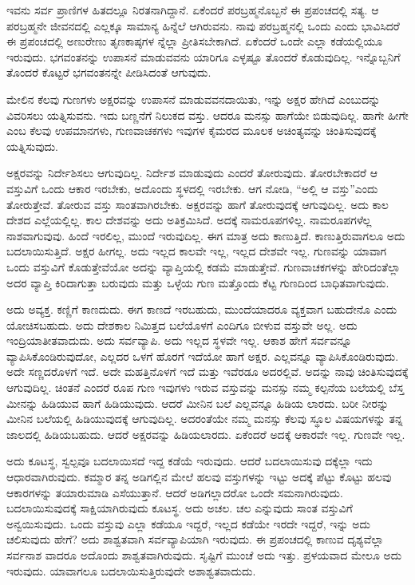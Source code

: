 ಇವನು ಸರ್ವ ಪ್ರಾಣಿಗಳ ಹಿತದಲ್ಲೂ ನಿರತನಾಗಿದ್ದಾನೆ. ಏಕೆಂದರೆ ಪರಬ್ರಹ್ಮನೊಬ್ಬನೆ ಈ ಪ್ರಪಂಚದಲ್ಲಿ ಸತ್ಯ. ಆ ಪರಬ್ರಹ್ಮನೇ ಜೀವನದಲ್ಲಿ ಎಲ್ಲಕ್ಕೂ ಸಾಮಾನ್ಯ ಹಿನ್ನೆಲೆ ಆಗಿರುವನು. ನಾವು ಪರಬ್ರಹ್ಮನಲ್ಲಿ ಒಂದು ಎಂದು ಭಾವಿಸಿದರೆ ಈ ಪ್ರಪಂಚದಲ್ಲಿ ಅಣುರೇಣು ತೃಣಕಾಷ್ಠಗಳ ನ್ನೆಲ್ಲಾ ಪ್ರೀತಿಸಬೇಕಾಗಿದೆ. ಏಕೆಂದರೆ ಒಂದೇ ಎಲ್ಲಾ ಕಡೆಯಲ್ಲಿಯೂ ಇರುವುದು. ಭಗವಂತನನ್ನು ಉಪಾಸನೆ ಮಾಡುವವನು ಯಾರಿಗೂ ಎಳ್ಳಷ್ಟೂ ತೊಂದರೆ ಕೊಡುವುದಿಲ್ಲ. ಇನ್ನೊಬ್ಬನಿಗೆ ತೊಂದರೆ ಕೊಟ್ಟರೆ ಭಗವಂತನನ್ನೇ ಪೀಡಿಸಿದಂತೆ ಆಗುವುದು.

ಮೇಲಿನ ಕೆಲವು ಗುಣಗಳು ಅಕ್ಷರವನ್ನು ಉಪಾಸನೆ ಮಾಡುವವನದಾಯಿತು, ಇನ್ನು ಅಕ್ಷರ ಹೇಗಿದೆ ಎಂಬುದನ್ನು ವಿವರಿಸಲು ಯತ್ನಿಸುವನು. ಇದು ಬಣ್ಣನೆಗೆ ನಿಲುಕದ ವಸ್ತು. ಆದರೂ ಮನಸ್ಸು ಹಾಗೆಯೇ ಬಿಡುವುದಿಲ್ಲ. ಹಾಗೇ ಹೀಗೇ ಎಂಬ ಕೆಲವು ಉಪಮಾನಗಳು, ಗುಣವಾಚಕಗಳು ಇವುಗಳ ಕೈಮರದ ಮೂಲಕ ಅಚಿಂತ್ಯವನ್ನು ಚಿಂತಿಸುವುದಕ್ಕೆ ಯತ್ನಿಸುವುದು.

ಅಕ್ಷರವನ್ನು ನಿರ್ದೇಶಿಸಲು ಆಗುವುದಿಲ್ಲ. ನಿರ್ದೇಶ ಮಾಡುವುದು ಎಂದರೆ ತೋರುವುದು. ತೋರಬೇಕಾದರೆ ಆ ವಸ್ತುವಿಗೆ ಒಂದು ಆಕಾರ ಇರಬೇಕು, ಅದೊಂದು ಸ್ಥಳದಲ್ಲಿ ಇರಬೇಕು. ಆಗ ನೋಡಿ, “ಅಲ್ಲಿ ಆ ವಸ್ತು”ಎಂದು ತೋರುತ್ತೇವೆ. ತೋರುವ ವಸ್ತು ಸಾಂತವಾಗಿರಬೇಕು. ಅಕ್ಷರವನ್ನು ಹಾಗೆ ತೋರುವುದಕ್ಕೆ ಆಗುವುದಿಲ್ಲ. ಅದು ಕಾಲ ದೇಶದ ಎಲ್ಲೆಯಲ್ಲಿಲ್ಲ. ಕಾಲ ದೇಶವನ್ನು ಅದು ಅತಿಕ್ರಮಿಸಿದೆ. ಅದಕ್ಕೆ ನಾಮರೂಪಗಳಿಲ್ಲ. ನಾಮರೂಪಗಳೆಲ್ಲ ನಾಶವಾಗುವುವು. ಹಿಂದೆ ಇರಲಿಲ್ಲ, ಮುಂದೆ ಇರುವುದಿಲ್ಲ. ಈಗ ಮಾತ್ರ ಅದು ಕಾಣುತ್ತಿದೆ. ಕಾಣುತ್ತಿರುವಾಗಲೂ ಅದು ಬದಲಾಯಿಸುತ್ತಿದೆ. ಅಕ್ಷರ ಹೀಗಲ್ಲ. ಅದು ಇಲ್ಲದ ಕಾಲವೇ ಇಲ್ಲ, ಇಲ್ಲದ ದೇಶವೇ ಇಲ್ಲ. ಗುಣವನ್ನು ಯಾವಾಗ ಒಂದು ವಸ್ತುವಿಗೆ ಕೊಡುತ್ತೇವೆಯೋ ಅದನ್ನು ವ್ಯಾಪ್ತಿಯಲ್ಲಿ ಕಡಮೆ ಮಾಡುತ್ತೇವೆ. ಗುಣವಾಚಕಗಳನ್ನು ಹೇರಿದಂತೆಲ್ಲಾ ಅದರ ವ್ಯಾಪ್ತಿ ಕಿರಿದಾಗುತ್ತಾ ಬರುವುದು ಮತ್ತು ಒಳ್ಳೆಯ ಗುಣ ಮತ್ತೊಂದು ಕೆಟ್ಟ ಗುಣದಿಂದ ಬಾಧಿತವಾಗುವುದು.

ಅದು ಅವ್ಯಕ್ತ. ಕಣ್ಣಿಗೆ ಕಾಣದುದು. ಈಗ ಕಾಣದೆ ಇರಬಹುದು, ಮುಂದೆಯಾದರೂ ವ್ಯಕ್ತವಾಗ ಬಹುದೇನೊ ಎಂದು ಯೋಚಿಸಬಹುದು. ಅದು ದೇಶಕಾಲ ನಿಮಿತ್ತದ ಬಲೆಯೊಳಗೆ ಎಂದಿಗೂ ಬೀಳುವ ವಸ್ತುವೇ ಅಲ್ಲ. ಅದು ಇಂದ್ರಿಯಾತೀತವಾದುದು. ಅದು ಸರ್ವವ್ಯಾಪಿ. ಅದು ಇಲ್ಲದ ಸ್ಥಳವೇ ಇಲ್ಲ. ಆಕಾಶ ಹೇಗೆ ಸರ್ವವನ್ನೂ ವ್ಯಾಪಿಸಿಕೊಂಡಿರುವುದೋ, ಎಲ್ಲದರ ಒಳಗೆ ಹೊರಗೆ ಇದೆಯೋ ಹಾಗೆ ಅಕ್ಷರ. ಎಲ್ಲವನ್ನೂ ವ್ಯಾಪಿಸಿಕೊಂಡಿರುವುದು. ಅದೇ ಸಣ್ಣದರೊಳಗೆ ಇದೆ. ಅದೇ ಮಹತ್ತಿನೊಳಗೆ ಇದೆ ಮತ್ತು ಇವೆರಡೂ ಅದರಲ್ಲಿವೆ. ಅದನ್ನು ನಾವು ಚಿಂತಿಸುವುದಕ್ಕೆ ಆಗುವುದಿಲ್ಲ. ಚಿಂತನೆ ಎಂದರೆ ರೂಪ ಗುಣ ಇವುಗಳು ಇರುವ ವಸ್ತುವನ್ನು ಮನಸ್ಸು ನಮ್ಮ ಕಲ್ಪನೆಯ ಬಲೆಯಲ್ಲಿ ಬೆಸ್ತ ಮೀನನ್ನು ಹಿಡಿಯುವ ಹಾಗೆ ಹಿಡಿಯುವುದು. ಆದರೆ ಮೀನಿನ ಬಲೆ ಎಲ್ಲವನ್ನೂ ಹಿಡಿಯ ಲಾರದು. ಬರೀ ನೀರನ್ನು ಮೀನಿನ ಬಲೆಯಲ್ಲಿ ಹಿಡಿಯುವುದಕ್ಕೆ ಆಗುವುದಿಲ್ಲ. ಅದರಂತೆಯೇ ನಮ್ಮ ಮನಸ್ಸು ಕೆಲವು ಸ್ಥೂಲ ವಿಷಯಗಳನ್ನು ತನ್ನ ಜಾಲದಲ್ಲಿ ಹಿಡಿಯಬಹುದು. ಆದರೆ ಅಕ್ಷರವನ್ನು ಹಿಡಿಯಲಾರದು. ಏಕೆಂದರೆ ಅದಕ್ಕೆ ಆಕಾರವೇ ಇಲ್ಲ. ಗುಣವೇ ಇಲ್ಲ.

ಅದು ಕೂಟಸ್ಥ, ಸ್ವಲ್ಪವೂ ಬದಲಾಯಿಸದೆ ಇದ್ದ ಕಡೆಯೆ ಇರುವುದು. ಆದರೆ ಬದಲಾಯಿಸುವು ದಕ್ಕೆಲ್ಲಾ ಇದು ಆಧಾರವಾಗಿರುವುದು. ಕಮ್ಮಾರ ತನ್ನ ಅಡಿಗಲ್ಲಿನ ಮೇಲೆ ಹಲವು ವಸ್ತುಗಳನ್ನು ಇಟ್ಟು ಅದಕ್ಕೆ ಪೆಟ್ಟು ಕೊಟ್ಟು ಹಲವು ಆಕಾರಗಳನ್ನು ತಯಾರುಮಾಡಿ ಎಸೆಯುತ್ತಾನೆ. ಆದರೆ ಅಡಿಗಲ್ಲಾದರೋ ಒಂದೇ ಸಮನಾಗಿರುವುದು. ಬದಲಾಯಿಸುವುದಕ್ಕೆ ಸಾಕ್ಷಿಯಾಗಿರುವುದು ಕೂಟಸ್ಥ. ಅದು ಅಚಲ. ಚಲ ಎನ್ನುವುದು ಸಾಂತ ವಸ್ತುವಿಗೆ ಅನ್ವಯಿಸುವುದು. ಒಂದು ವಸ್ತುವು ಎಲ್ಲಾ ಕಡೆಯೂ ಇದ್ದರೆ, ಇಲ್ಲದ ಕಡೆಯೇ ಇರದೇ ಇದ್ದರೆ, ಇನ್ನು ಅದು ಚಲಿಸುವುದು ಹೇಗೆ? ಅದು ಶಾಶ್ವತವಾಗಿ ಸರ್ವವ್ಯಾಪಿಯಾಗಿ ಇರುವುದು. ಈ ಪ್ರಪಂಚದಲ್ಲಿ ಕಾಣುವ ದೃಶ್ಯವೆಲ್ಲಾ ಸರ್ವನಾಶ ವಾದರೂ ಅದೊಂದು ಶಾಶ್ವತವಾಗಿರುವುದು. ಸೃಷ್ಟಿಗೆ ಮುಂಚೆ ಅದು ಇತ್ತು. ಪ್ರಳಯವಾದ ಮೇಲೂ ಅದು ಇರುವುದು. ಯಾವಾಗಲೂ ಬದಲಾಯಿಸುತ್ತಿರುವುದೇ ಅಶಾಶ್ವತವಾದುದು.

